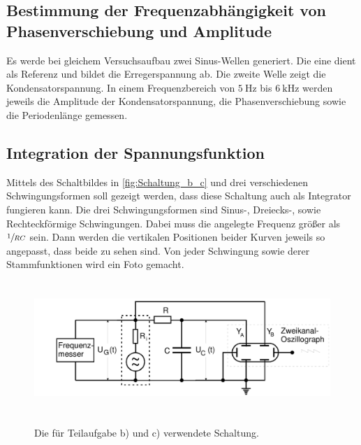 \subsection{Bestimmung der Frequenzabhängigkeit von Phasenverschiebung und Amplitude}
Es werde bei gleichem Versuchsaufbau zwei Sinus-Wellen generiert. Die eine dient als Referenz
und bildet die Erregerspannung ab. Die zweite Welle zeigt die Kondensatorspannung.  
In einem Frequenzbereich von $\qty{5}{\hertz}$ bis $\qty{6}{\kilo\hertz}$ werden jeweils
die Amplitude der Kondensatorspannung, die Phasenverschiebung sowie die Periodenlänge
gemessen.
\subsection{Integration der Spannungsfunktion}
Mittels des Schaltbildes in \autoref{fig:Schaltung_b_c} und drei verschiedenen 
Schwingungsformen soll gezeigt werden, dass diese Schaltung auch als Integrator fungieren 
kann. Die drei Schwingungsformen sind Sinus-, Dreiecks-, sowie Rechteckförmige Schwingungen.
Dabei muss die angelegte Frequenz größer als $\sfrac{1}{RC}$ sein. Dann werden die vertikalen 
Positionen beider Kurven jeweils so angepasst, dass beide zu sehen sind. Von jeder Schwingung 
sowie derer Stammfunktionen wird ein Foto gemacht.
\begin{figure}
    \centering
    \includegraphics[height=5cm]{messdaten/Schaltung_b_c.png}
    \label{fig:Schaltung_b_c}
    \caption{Die für Teilaufgabe b) und c) verwendete Schaltung.}
\end{figure}